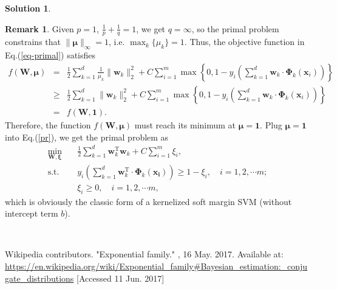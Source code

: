 \documentclass[a4paper,UTF8]{article}
\numberwithin{equation}{section}
\theoremstyle{definition}
\newtheorem*{solution}{Solution}
\newtheorem*{Remark}{Remark}
\begin{document}
\begin{solution}
\begin{Remark}
Given $p=1$, $\frac{1}{p}+\frac{1}{q}=1$, we get $q=\infty$, so the primal problem constrains that $\|\bm\mu\|_\infty=1$, i.e. $\max_{k}\{\mu_k\}=1$. Thus, the objective function in Eq.(\ref{eq-primal}) satisfies
\begin{eqnarray}
f(\bm{W},\bm{\mu})&=&\frac{1}{2} \sum_{k=1}^d \frac{1}{\mu_k}\lVert\bm w_k\rVert_2^2 + C\sum_{i=1}^m \max\left\lbrace 0,1 - y_i\left(\sum_{k=1}^d \bm w_k \cdot \bm \Phi_k(\bm{x}_i)\right) \right\rbrace\nonumber\\
&\geq&\frac{1}{2} \sum_{k=1}^d\lVert\bm w_k\rVert_2^2 + C\sum_{i=1}^m \max\left\lbrace 0,1 - y_i\left(\sum_{k=1}^d \bm w_k \cdot \bm \Phi_k(\bm{x}_i)\right)\right\rbrace\nonumber\\
&=&f(\bm{W}, \bm{1}).
\end{eqnarray}
Therefore, the function $f(\bm{W},\bm{\mu})$ must reach its minimum at $\bm{\mu}=\bm{1}$. Plug $\bm\mu=\bm1$ into Eq.(\ref{pr}), we get the primal problem as
\begin{equation}
\begin{split}
\min_{\bm{W}, \bm{\xi}} &\quad\frac{1}{2}\sum_{k=1}^d\bm{w}_k^\mathrm{T}\bm{w}_k+C\sum_{i=1}^m\xi_i,\\
\text{s.t.} &\quad y_i\left(\sum_{k=1}^d\bm{w}_k^\mathrm{T}\cdot\bm{\Phi}_k(\bm{x_i})\right)\geq 1-\xi_i, \quad i=1,2,\cdots m;\\
&\quad \xi_i\geq 0, \quad i=1,2,\cdots m,
\end{split}
\end{equation}
which is obviously the classic form of a kernelized soft margin SVM (without intercept term $b$).
\end{Remark}
~\\
\end{solution}


\begin{thebibliography}{99}
 Wikipedia contributors. "Exponential family." , 16 May. 2017. Available at: \url{https://en.wikipedia.org/wiki/Exponential_family#Bayesian_estimation:_conjugate_distributions} [Accessed 11 Jun. 2017]
\end{thebibliography}
\end{document}
